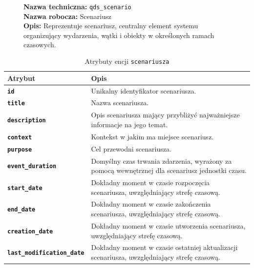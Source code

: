 \begin{figure}[H]
    \centering
    \begin{minipage}{0.8\textwidth} 
        \begin{framed}
            \noindent\textbf{\large Nazwa techniczna:} \texttt{qds\_scenario} \\
            \textbf{\large Nazwa robocza:} Scenariusz \\
            \textbf{\large Opis:} Reprezentuje scenariusz, centralny element systemu organizujący
            wydarzenia, wątki i obiekty w określonych ramach czasowych.
        \end{framed}
    \end{minipage}
\end{figure}


\begin{table}[H]
    \centering
    \renewcommand{\arraystretch}{1.6}
    \begin{tabular}{|>{\bfseries}l|p{}|}
        \hline
        \rowcolor[HTML]{EFEFEF} \textbf{Atrybut} & \textbf{Opis} \\
        \hline
        \texttt{id} & Unikalny identyfikator scenariusza. \\
        \hline
        \texttt{title} & Nazwa scenariusza. \\
        \hline
        \texttt{description} & Opis scenariusza mający przybliżyć najważniejsze informacje na jego temat. \\
        \hline
        \texttt{context} & Kontekst w jakim ma miejsce scenariusz. \\
        \hline
        \texttt{purpose} & Cel przewodni scenariusza. \\
        \hline
        \texttt{event\_duration} & Domyślny czas trwania zdarzenia, wyrażony za pomocą wewnętrznej dla scenariusz jednostki czasu. \\
        \hline
        \texttt{start\_date} & Dokładny moment w czasie rozpoczęcia scenariusza, uwzględniający strefę czasową. \\
        \hline
        \texttt{end\_date} & Dokładny moment w czasie zakończenia scenariusza, uwzględniający strefę czasową. \\
        \hline
        \texttt{creation\_date} & Dokładny moment w czasie utworzenia scenariusza, uwzględniający strefę czasową. \\
        \hline
        \texttt{last\_modification\_date} & Dokładny moment w czasie ostatniej aktualizacji scenariusza, uwzględniający strefę czasową. \\
        \hline
    \end{tabular}
    \caption{Atrybuty encji \texttt{scenariusza}}
\end{table}

